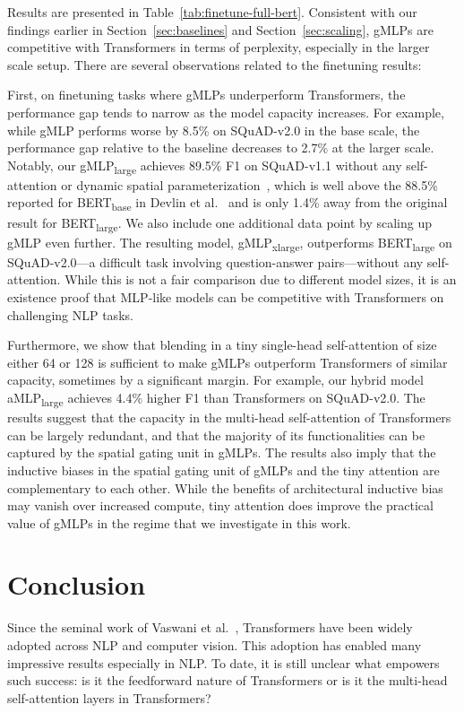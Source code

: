 \documentclass{article}
\newcommand{\gffn}{gMLP\xspace}
\begin{document}
Results are presented in Table~\ref{tab:finetune-full-bert}. Consistent with our findings earlier in Section~\ref{sec:baselines} and Section~\ref{sec:scaling}, \gffn{s} are competitive with Transformers in terms of perplexity, especially in the larger scale setup. There are several observations related to the finetuning results:

First,
on finetuning tasks where \gffn{s} underperform Transformers,
the performance gap tends to narrow as the model capacity increases.
For example,
while \gffn performs worse by 8.5\% on SQuAD-v2.0 in the base scale,
the performance gap relative to the baseline decreases to 2.7\% at the larger scale.
Notably,
our gMLP\textsubscript{large} achieves 89.5\% F1 on SQuAD-v1.1 without any self-attention or dynamic spatial parameterization~\cite{wu2019pay},
which is well above the 88.5\% reported for BERT\textsubscript{base} in Devlin et al.~\cite{devlin2018bert} and is only 1.4\% away from the original result for BERT\textsubscript{large}.
We also include one additional data point by scaling up gMLP even further.
The resulting model, gMLP\textsubscript{xlarge}, outperforms BERT\textsubscript{large} on SQuAD-v2.0---a difficult task involving question-answer pairs---without any self-attention.
While this is not a fair comparison due to different model sizes,
it is an existence proof that MLP-like models can be competitive with Transformers on challenging NLP tasks.

Furthermore,
we show that blending in a tiny single-head self-attention of size either 64 or 128 is sufficient to make \gffn{s} outperform Transformers of similar capacity,
sometimes by a significant margin.
For example,
our hybrid model aMLP\textsubscript{large} achieves 4.4\% higher F1 than Transformers on SQuAD-v2.0.
The results suggest that the capacity in the multi-head self-attention of Transformers can be largely redundant,
and that the majority of its functionalities can be captured by the spatial gating unit in \gffn{s}.
The results also imply that the inductive biases in the spatial gating unit of \gffn{s} and the tiny attention are complementary to each other.
While the benefits of architectural inductive bias may vanish over increased compute,
tiny attention does improve the practical value of \gffn{s} in the regime that we investigate in this work.


\section{Conclusion}
Since the seminal work of Vaswani et al.~\cite{vaswani2017attention}, Transformers have been widely adopted across NLP and computer vision. This adoption has enabled many impressive results especially in NLP. To date, it is still unclear what empowers such success: is it the feedforward nature of Transformers or is it the multi-head self-attention layers in Transformers?
\end{document}
